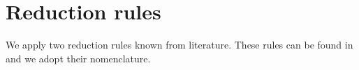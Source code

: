 
\section{Reduction rules}\label{sec:reductions}
We apply two reduction rules known from literature.
These rules can be found in \cite{lemaic2008markov} and we adopt their nomenclature.



